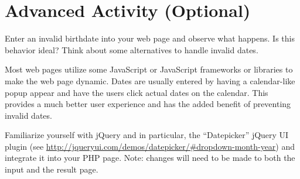 \documentclass[12pt]{scrartcl}
\begin{document}

\section*{Advanced Activity (Optional)}

Enter an invalid birthdate into your web page and observe 
what happens.  Is this behavior ideal?  Think about some 
alternatives to handle invalid dates.

Most web pages utilize some JavaScript or JavaScript frameworks 
or libraries to make the web page dynamic.  Dates are usually 
entered by having a calendar-like popup appear and have the 
users click actual dates on the calendar.  This provides a 
much better user experience and has the added benefit of 
preventing invalid dates.  

Familiarize yourself with jQuery and in particular, the ``Datepicker'' 
jQuery UI plugin (see \url{http://jqueryui.com/demos/datepicker/#dropdown-month-year}) and integrate it into your PHP page.  Note: 
changes will need to be made to both the input and the 
result page.
\end{document}
